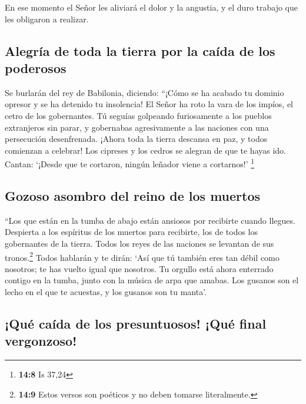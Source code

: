  En ese momento el Señor les aliviará el dolor y la
angustia, y el duro trabajo que les obligaron a realizar.

\hypertarget{alegruxeda-de-toda-la-tierra-por-la-cauxedda-de-los-poderosos}{%
\subsection{Alegría de toda la tierra por la caída de los
poderosos}\label{alegruxeda-de-toda-la-tierra-por-la-cauxedda-de-los-poderosos}}

 Se burlarán del rey de Babilonia, diciendo: ``¡Cómo se ha
acabado tu dominio opresor y se ha detenido tu insolencia!
 El Señor ha roto la vara de los impíos, el cetro de los
gobernantes.  Tú seguías golpeando furiosamente a los
pueblos extranjeros sin parar, y gobernabas agresivamente a las naciones
con una persecución desenfrenada.  ¡Ahora toda la tierra
descansa en paz, y todos comienzan a celebrar!  Los
cipreses y los cedros se alegran de que te hayas ido. Cantan: `¡Desde
que te cortaron, ningún leñador viene a cortarnos!' \footnote{\textbf{14:8}
  Is 37,24}

\hypertarget{gozoso-asombro-del-reino-de-los-muertos}{%
\subsection{Gozoso asombro del reino de los
muertos}\label{gozoso-asombro-del-reino-de-los-muertos}}

 ``Los que están en la tumba de abajo están ansiosos por
recibirte cuando llegues. Despierta a los espíritus de los muertos para
recibirte, los de todos los gobernantes de la tierra. Todos los reyes de
las naciones se levantan de sus tronos.\footnote{\textbf{14:9} Estos
  versos son poéticos y no deben tomarse literalmente.} 
Todos hablarán y te dirán: `Así que tú también eres tan débil como
nosotros; te has vuelto igual que nosotros.  Tu orgullo
está ahora enterrado contigo en la tumba, junto con la música de arpa
que amabas. Los gusanos son el lecho en el que te acuestas, y los
gusanos son tu manta'.

\hypertarget{quuxe9-cauxedda-de-los-presuntuosos-quuxe9-final-vergonzoso}{%
\subsection{¡Qué caída de los presuntuosos! ¡Qué final
vergonzoso!}\label{quuxe9-cauxedda-de-los-presuntuosos-quuxe9-final-vergonzoso}}

